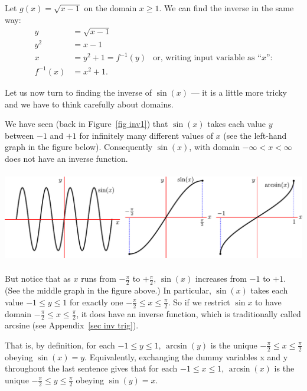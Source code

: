 \begin{eg}
Let $g(x) = \sqrt{x-1}$ on the domain $x \geq 1$. We can find the inverse in the same way:
\begin{align*}
  y &= \sqrt{x-1} \\
  y^2 &= x-1 \\
  x &= y^2+1 = f^{-1}(y) & \text{or, writing input variable as ``$x$'':} \\
  f^{-1}(x) &= x^2+1.
\end{align*}
\end{eg}

Let us now turn to finding the inverse of $\sin(x)$ --- it is a little more tricky and we
have to think carefully about domains.


\begin{eg}
We have seen (back in Figure~\ref{fig inv1}) that $\sin(x)$ takes each value $y$
between $-1$ and $+1$ for infinitely many different values of $x$ (see
the left-hand graph in the figure below). Consequently $\sin(x)$, with domain
$-\infty <x <\infty$ does not have an inverse function.
\begin{wfig}
\begin{center}
 \includegraphics[height=4cm]{inv2B}
\end{center}
\end{wfig}
But notice that as $x$ runs from $-\frac{\pi}{2}$ to $+\frac{\pi}{2}$, $\sin(x)$ increases
from $-1$ to $+1$. (See the middle graph in the figure above.) In particular, $\sin(x)$
takes each value $-1 \le y\le 1$ for exactly one $-\frac{\pi}{2}\le x\le \frac{\pi}{2}$.
So if we restrict $\sin x$ to have domain $-\frac{\pi}{2}\le x\le \frac{\pi}{2}$, it does
have an inverse function, which is traditionally called arcsine (see Appendix~\ref{sec
inv trig}).

That is, by definition, for each $-1\le y\le 1$, $\arcsin(y)$ is the unique
$-\frac{\pi}{2}\le x\le \frac{\pi}{2}$ obeying $\sin(x)=y$. Equivalently, exchanging the
dummy variables x and y throughout the last sentence gives that for each $-1\le
x\le 1$, $\arcsin(x)$ is the unique $-\frac{\pi}{2}\le y\le \frac{\pi}{2}$
obeying $\sin(y)=x$.
\end{eg}



